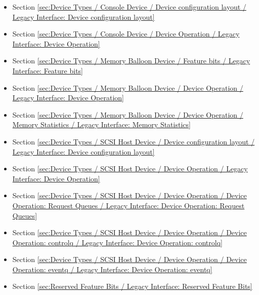 \begin{itemize}
\item Section \ref{sec:Device Types / Console Device / Device configuration layout / Legacy Interface: Device configuration layout}
\item Section \ref{sec:Device Types / Console Device / Device Operation / Legacy Interface: Device Operation}
\item Section \ref{sec:Device Types / Memory Balloon Device / Feature bits / Legacy Interface: Feature bits}
\item Section \ref{sec:Device Types / Memory Balloon Device / Device Operation / Legacy Interface: Device Operation}
\item Section \ref{sec:Device Types / Memory Balloon Device / Device Operation / Memory Statistics / Legacy Interface: Memory Statistics}
\item Section \ref{sec:Device Types / SCSI Host Device / Device configuration layout / Legacy Interface: Device configuration layout}
\item Section \ref{sec:Device Types / SCSI Host Device / Device Operation / Legacy Interface: Device Operation}
\item Section \ref{sec:Device Types / SCSI Host Device / Device Operation / Device Operation: Request Queues / Legacy Interface: Device Operation: Request Queues}
\item Section \ref{sec:Device Types / SCSI Host Device / Device Operation / Device Operation: controlq / Legacy Interface: Device Operation: controlq}
\item Section \ref{sec:Device Types / SCSI Host Device / Device Operation / Device Operation: eventq / Legacy Interface: Device Operation: eventq}
\item Section \ref{sec:Reserved Feature Bits / Legacy Interface: Reserved Feature Bits}
\end{itemize}
